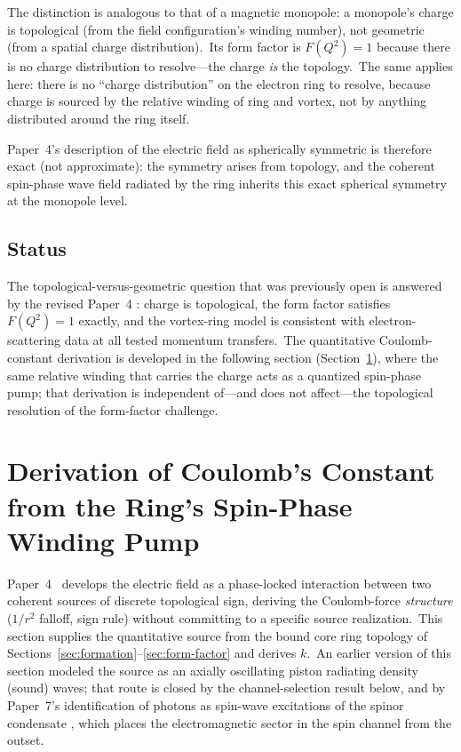 \documentclass[12pt,letterpaper]{article}
\begin{document}
The distinction is analogous to that of a magnetic monopole: a monopole's
charge is topological (from the field configuration's winding number),
not geometric (from a spatial charge distribution).\ Its form factor is
$F(Q^2) = 1$ because there is no charge distribution to resolve---the
charge \emph{is} the topology.\ The same applies here: there is no
``charge distribution'' on the electron ring to resolve, because charge is
sourced by the relative winding of ring and vortex, not by anything
distributed around the ring itself.

Paper~4's description of the electric field as spherically symmetric is
therefore exact (not approximate): the symmetry arises from topology, and
the coherent spin-phase wave field radiated by the ring inherits
this exact spherical symmetry at the monopole level.

\subsection{Status}

The topological-versus-geometric question that was previously open is
answered by the revised Paper~4 \cite{otto-em}: charge is topological, the
form factor satisfies $F(Q^2) = 1$ exactly, and the vortex-ring model is
consistent with electron-scattering data at all tested momentum transfers.\
The quantitative Coulomb-constant derivation is developed in the following
section (Section~\ref{sec:coulomb-derivation}), where the same relative
winding that carries the charge acts as a quantized spin-phase pump; that
derivation is independent of---and does not affect---the topological
resolution of the form-factor challenge.


\section{Derivation of Coulomb's Constant from the Ring's Spin-Phase Winding Pump}
\label{sec:coulomb-derivation}

Paper~4~\cite{otto-em} develops the electric field as a phase-locked
interaction between two coherent sources of discrete topological sign,
deriving the Coulomb-force \emph{structure} ($1/r^2$ falloff, sign rule)
without committing to a specific source realization.\ This section
supplies the quantitative source from the bound core ring topology of
Sections~\ref{sec:formation}--\ref{sec:form-factor} and derives $k$.\ An
earlier version of this section modeled the source as an axially
oscillating piston radiating density (sound) waves; that route is closed
by the channel-selection result below, and by Paper~7's identification of
photons as spin-wave excitations of the spinor condensate
\cite{otto-quantum}, which places the electromagnetic sector in the spin
channel from the outset.
\end{document}
